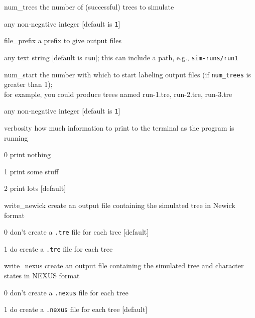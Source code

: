 \documentclass[10pt]{article}
\begin{document}
\begin{optdescrip}
\begin{valdescrip}
		\end{valdescrip}
	\item[num\_trees] the number of (successful) trees to simulate
		\begin{valdescrip}
			\item[] any non-negative integer [default is \texttt{1}]
		\end{valdescrip}
	\item[file\_prefix] a prefix to give output files
		\begin{valdescrip}
			\item[] any text string [default is \texttt{run}];
				this can include a path, e.g., \texttt{sim-runs/run1}
		\end{valdescrip}
	\item[num\_start] the number with which to start labeling output files (if \texttt{num\_trees} is greater than 1); \\ for example, you could produce trees named run-1.tre, run-2.tre, run-3.tre
		\begin{valdescrip}
			\item[] any non-negative integer [default is \texttt{1}]
		\end{valdescrip}
	\item[verbosity] how much information to print to the terminal as the program is running
		\begin{valdescrip}
			\item[0] print nothing
			\item[1] print some stuff
			\item[2] print lots [default]
		\end{valdescrip}
	\item[write\_newick] create an output file containing the simulated tree in Newick format
		\begin{valdescrip}
			\item[0] don't create a \texttt{.tre} file for each tree [default]
			\item[1] do create a \texttt{.tre} file for each tree
		\end{valdescrip}
	\item[write\_nexus] create an output file containing the simulated tree and character states in NEXUS format
		\begin{valdescrip}
			\item[0] don't create a \texttt{.nexus} file for each tree
			\item[1] do create a \texttt{.nexus} file for each tree [default]
		\end{valdescrip}

\end{optdescrip}
\end{document}
